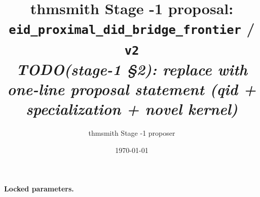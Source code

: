 \documentclass[11pt]{article}
\title{thmsmith Stage -1 proposal: \texttt{eid\_proximal\_did\_bridge\_frontier} / \texttt{v2}%
  \\ \large\textit{TODO(stage-1 \S2): replace with one-line proposal statement (qid + specialization + novel kernel)}}
\author{thmsmith Stage -1 proposer}
\date{\today}
\theoremstyle{definition}
\theoremstyle{plain}
\theoremstyle{remark}
\begin{document}
\maketitle


\paragraph{Locked parameters.}

\begin{abstract}
\end{abstract}
\end{document}
